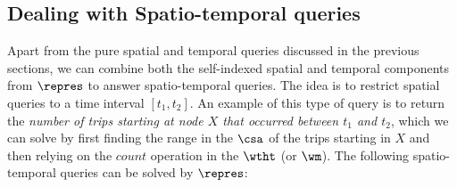 \begin{itemize}[leftmargin=3mm]
% 
% 
\end{itemize}

\subsection{Dealing with Spatio-temporal queries}
\label{sec:stq}
Apart from the pure spatial and temporal queries discussed in the previous sections, %
we can combine both the self-indexed spatial and temporal components from $\repres$ to answer spatio-temporal queries. 
The idea is to restrict spatial queries to a time interval $[t_1, t_2]$.  An example of this type of query is to return  the
{\em number of trips starting at node $X$ that occurred between $t_1$ and $t_2$}, which we can solve by first finding the
range in the $\csa$ of the trips starting in $X$ and then relying on the  ${count}$
operation in the $\wtht$ (or $\wm$). The following spatio-temporal queries can be solved by $\repres$:



